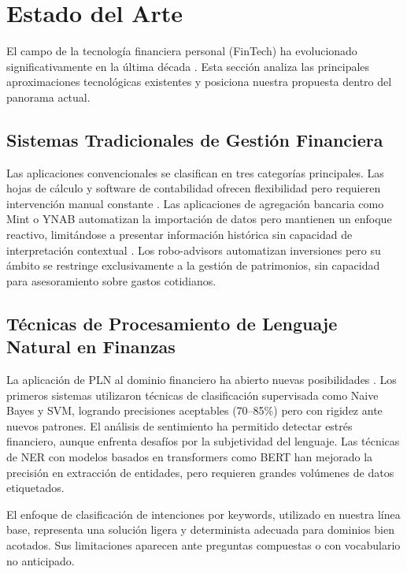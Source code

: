 \section{Estado del Arte}
\label{sec:estado_arte}

El campo de la tecnología financiera personal (FinTech) ha evolucionado significativamente en la última década \cite{fintech2023}. Esta sección analiza las principales aproximaciones tecnológicas existentes y posiciona nuestra propuesta dentro del panorama actual.

\subsection{Sistemas Tradicionales de Gestión Financiera}
\label{subsec:sistemas_tradicionales}

Las aplicaciones convencionales se clasifican en tres categorías principales. Las hojas de cálculo y software de contabilidad ofrecen flexibilidad pero requieren intervención manual constante \cite{personal_finance_ai2024}. Las aplicaciones de agregación bancaria como Mint o YNAB automatizan la importación de datos pero mantienen un enfoque reactivo, limitándose a presentar información histórica sin capacidad de interpretación contextual \cite{conversational_ai2023}. Los robo-advisors automatizan inversiones pero su ámbito se restringe exclusivamente a la gestión de patrimonios, sin capacidad para asesoramiento sobre gastos cotidianos.

\subsection{Técnicas de Procesamiento de Lenguaje Natural en Finanzas}
\label{subsec:pln_finanzas}

La aplicación de PLN al dominio financiero ha abierto nuevas posibilidades \cite{nlp_finance2023}. Los primeros sistemas utilizaron técnicas de clasificación supervisada como Naive Bayes y SVM, logrando precisiones aceptables (70--85\%) pero con rigidez ante nuevos patrones. El análisis de sentimiento ha permitido detectar estrés financiero, aunque enfrenta desafíos por la subjetividad del lenguaje. Las técnicas de NER con modelos basados en transformers como BERT han mejorado la precisión en extracción de entidades, pero requieren grandes volúmenes de datos etiquetados.

El enfoque de clasificación de intenciones por keywords, utilizado en nuestra línea base, representa una solución ligera y determinista adecuada para dominios bien acotados. Sus limitaciones aparecen ante preguntas compuestas o con vocabulario no anticipado.

